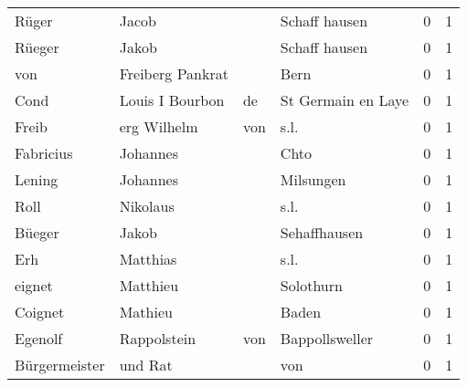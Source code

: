 \begin{center}
\begin{tiny}
\begin{longtabu}{llllrr}
                    Rüger &                              Jacob &             &                               Schaff hausen &          0 &         1 \\
                   Rüeger &                              Jakob &             &                               Schaff hausen &          0 &         1 \\
                      von &                   Freiberg Pankrat &             &                                        Bern &          0 &         1 \\
                     Cond &                   Louis I  Bourbon &          de &                          St Germain en Laye &          0 &         1 \\
                    Freib &                        erg Wilhelm &         von &                                        s.l. &          0 &         1 \\
                Fabricius &                           Johannes &             &                                        Chto &          0 &         1 \\
                   Lening &                           Johannes &             &                                   Milsungen &          0 &         1 \\
                     Roll &                           Nikolaus &             &                                        s.l. &          0 &         1 \\
                   Büeger &                              Jakob &             &                                Sehaffhausen &          0 &         1 \\
                      Erh &                           Matthias &             &                                        s.l. &          0 &         1 \\
                   eignet &                           Matthieu &             &                                   Solothurn &          0 &         1 \\
                  Coignet &                            Mathieu &             &                                       Baden &          0 &         1 \\
                  Egenolf &                        Rappolstein &         von &                              Bappollsweller &          0 &         1 \\
            Bürgermeister &                            und Rat &             &                                         von &          0 &         1 \\

\end{longtabu}
\end{tiny}
\end{center}

